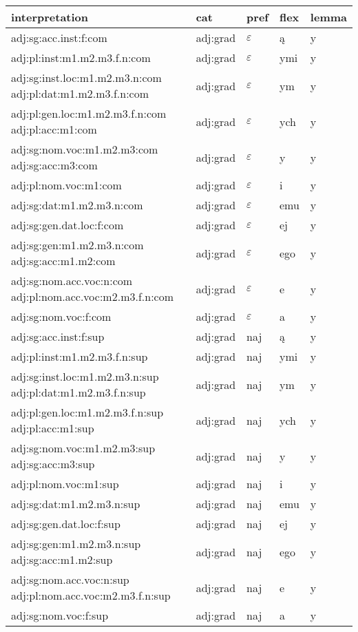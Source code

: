 \documentclass{article}
\begin{document}
\begin{longtable}{p{7cm}|l|l|l|l}
interpretation & cat & pref & flex & lemma\\
\hline
adj:sg:acc.inst:f:com & adj:grad & $\varepsilon$ & ą & y\\
adj:pl:inst:m1.m2.m3.f.n:com & adj:grad & $\varepsilon$ & ymi & y\\
adj:sg:inst.loc:m1.m2.m3.n:com adj:pl:dat:m1.m2.m3.f.n:com & adj:grad & $\varepsilon$ & ym & y\\
adj:pl:gen.loc:m1.m2.m3.f.n:com adj:pl:acc:m1:com & adj:grad & $\varepsilon$ & ych & y\\
adj:sg:nom.voc:m1.m2.m3:com adj:sg:acc:m3:com & adj:grad & $\varepsilon$ & y & y\\
adj:pl:nom.voc:m1:com & adj:grad & $\varepsilon$ & i & y\\
adj:sg:dat:m1.m2.m3.n:com & adj:grad & $\varepsilon$ & emu & y\\
adj:sg:gen.dat.loc:f:com & adj:grad & $\varepsilon$ & ej & y\\
adj:sg:gen:m1.m2.m3.n:com adj:sg:acc:m1.m2:com & adj:grad & $\varepsilon$ & ego & y\\
adj:sg:nom.acc.voc:n:com adj:pl:nom.acc.voc:m2.m3.f.n:com & adj:grad & $\varepsilon$ & e & y\\
adj:sg:nom.voc:f:com & adj:grad & $\varepsilon$ & a & y\\
adj:sg:acc.inst:f:sup & adj:grad & naj & ą & y\\
adj:pl:inst:m1.m2.m3.f.n:sup & adj:grad & naj & ymi & y\\
adj:sg:inst.loc:m1.m2.m3.n:sup adj:pl:dat:m1.m2.m3.f.n:sup & adj:grad & naj & ym & y\\
adj:pl:gen.loc:m1.m2.m3.f.n:sup adj:pl:acc:m1:sup & adj:grad & naj & ych & y\\
adj:sg:nom.voc:m1.m2.m3:sup adj:sg:acc:m3:sup & adj:grad & naj & y & y\\
adj:pl:nom.voc:m1:sup & adj:grad & naj & i & y\\
adj:sg:dat:m1.m2.m3.n:sup & adj:grad & naj & emu & y\\
adj:sg:gen.dat.loc:f:sup & adj:grad & naj & ej & y\\
adj:sg:gen:m1.m2.m3.n:sup adj:sg:acc:m1.m2:sup & adj:grad & naj & ego & y\\
adj:sg:nom.acc.voc:n:sup adj:pl:nom.acc.voc:m2.m3.f.n:sup & adj:grad & naj & e & y\\
adj:sg:nom.voc:f:sup & adj:grad & naj & a & y\\
\end{longtable}
\end{document}
